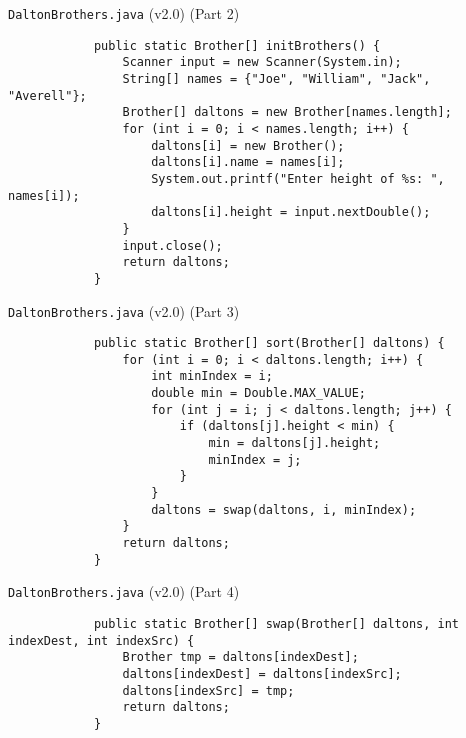 \documentclass[10pt, compress]{beamer}
\begin{document}
\begin{slide}
	\begin{block}{\texttt{DaltonBrothers.java} (v2.0) (Part 2)}
		\begin{verbatim}
			public static Brother[] initBrothers() {
			    Scanner input = new Scanner(System.in);
			    String[] names = {"Joe", "William", "Jack", "Averell"};
			    Brother[] daltons = new Brother[names.length];
			    for (int i = 0; i < names.length; i++) {
			        daltons[i] = new Brother();
			        daltons[i].name = names[i];
			        System.out.printf("Enter height of %s: ", names[i]);
			        daltons[i].height = input.nextDouble();
			    }
			    input.close();
			    return daltons;
			}
		\end{verbatim}
	\end{block}
\end{slide}

\begin{slide}
	\begin{block}{\texttt{DaltonBrothers.java} (v2.0) (Part 3)}
		\begin{verbatim}
			public static Brother[] sort(Brother[] daltons) {
			    for (int i = 0; i < daltons.length; i++) {
			        int minIndex = i;
			        double min = Double.MAX_VALUE;
			        for (int j = i; j < daltons.length; j++) {
			            if (daltons[j].height < min) {
			                min = daltons[j].height;
			                minIndex = j;
			            }
			        }
			        daltons = swap(daltons, i, minIndex);
			    }
			    return daltons;
			}
		\end{verbatim}
	\end{block}
\end{slide}

\begin{slide}
	\begin{block}{\texttt{DaltonBrothers.java} (v2.0) (Part 4)}
		\begin{verbatim}
			public static Brother[] swap(Brother[] daltons, int indexDest, int indexSrc) {
			    Brother tmp = daltons[indexDest];
			    daltons[indexDest] = daltons[indexSrc];
			    daltons[indexSrc] = tmp;
			    return daltons;
			}
		\end{verbatim}
	\end{block}
\end{slide}
\end{document}
